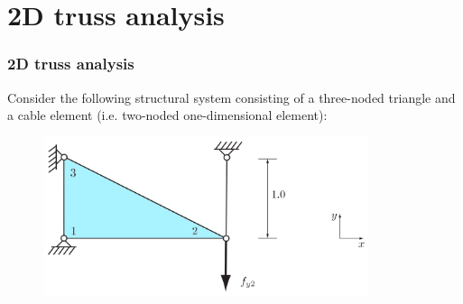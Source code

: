 \documentclass[notes]{beamer}
\begin{document}
\section{2D truss analysis}
\begin{frame}
\frametitle{2D truss analysis}
Consider the following structural system consisting of a three-noded triangle and a cable
element (i.e. two-noded one-dimensional element):

\begin{figure}
	\centering
	\includegraphics[width=0.85\textwidth]{figs/2d-truss.png}
\end{figure}
\end{frame}
\end{document}
